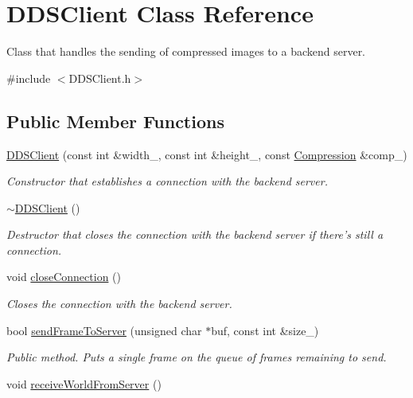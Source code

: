 \hypertarget{class_d_d_s_client}{\section{D\+D\+S\+Client Class Reference}
\label{class_d_d_s_client}
}


Class that handles the sending of compressed images to a backend server.  




{\ttfamily \#include $<$D\+D\+S\+Client.\+h$>$}

\subsection*{Public Member Functions}
\begin{DoxyCompactItemize}
\item 
\hyperlink{class_d_d_s_client_a4d17bf120f9f3b3ec9e58010977f8de5}{D\+D\+S\+Client} (const int \&width\+\_\+, const int \&height\+\_\+, const \hyperlink{_compression_strategy_8h_a56a83bf6847f4801f4205eb4be237ccf}{Compression} \&comp\+\_\+)
\begin{DoxyCompactList}\small\item\em Constructor that establishes a connection with the backend server. \end{DoxyCompactList}\item 
\hypertarget{class_d_d_s_client_a3e3b8caddd8aa825f6895857591a4040}{\hyperlink{class_d_d_s_client_a3e3b8caddd8aa825f6895857591a4040}{$\sim$\+D\+D\+S\+Client} ()}\label{class_d_d_s_client_a3e3b8caddd8aa825f6895857591a4040}

\begin{DoxyCompactList}\small\item\em Destructor that closes the connection with the backend server if there's still a connection. \end{DoxyCompactList}\item 
\hypertarget{class_d_d_s_client_ab46ef5c251ae4896044436ed0443c17d}{void \hyperlink{class_d_d_s_client_ab46ef5c251ae4896044436ed0443c17d}{close\+Connection} ()}\label{class_d_d_s_client_ab46ef5c251ae4896044436ed0443c17d}

\begin{DoxyCompactList}\small\item\em Closes the connection with the backend server. \end{DoxyCompactList}\item 
bool \hyperlink{class_d_d_s_client_a93c7cf22bb7bd1fb663dd44406febecb}{send\+Frame\+To\+Server} (unsigned char $\ast$buf, const int \&size\+\_\+)
\begin{DoxyCompactList}\small\item\em Public method. Puts a single frame on the queue of frames remaining to send. \end{DoxyCompactList}\item 
\hypertarget{class_d_d_s_client_aaa2d92dfb333a3a2d3e2acb65c338e26}{void \hyperlink{class_d_d_s_client_aaa2d92dfb333a3a2d3e2acb65c338e26}{receive\+World\+From\+Server} ()}\label{class_d_d_s_client_aaa2d92dfb333a3a2d3e2acb65c338e26}


\end{DoxyCompactItemize}
